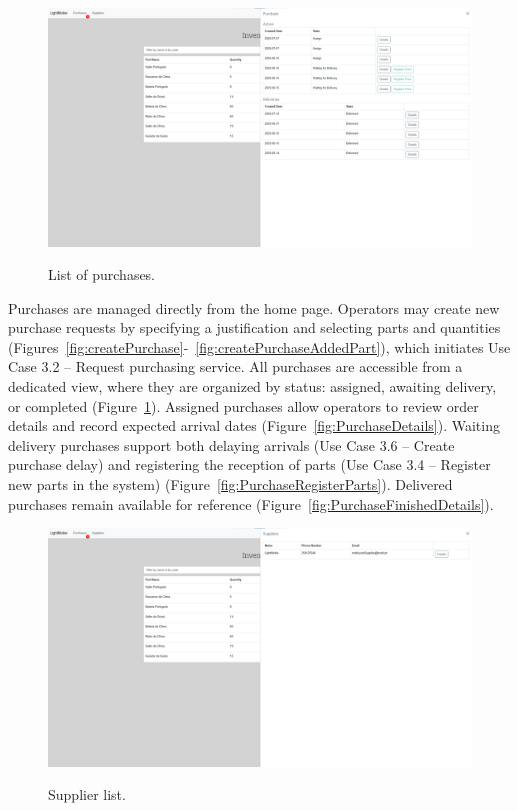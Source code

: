 \begin{figure}[h]
  \caption{List of purchases.}
  \centering
  \includegraphics[width=\textwidth]{figs/Implementation/warehouse/PurchaseList}
  \label{fig:PurchaseList}
\end{figure}






Purchases are managed directly from the home page. Operators may create new purchase requests by specifying a justification and selecting parts and quantities (Figures~\ref{fig:createPurchase}-~\ref{fig:createPurchaseAddedPart}), which initiates Use Case 3.2 – Request purchasing service. All purchases are accessible from a dedicated view, where they are organized by status: assigned, awaiting delivery, or completed (Figure~\ref{fig:PurchaseList}). Assigned purchases allow operators to review order details and record expected arrival dates (Figure~\ref{fig:PurchaseDetails}). Waiting delivery purchases support both delaying arrivals (Use Case 3.6 – Create purchase delay) and registering the reception of parts (Use Case 3.4 – Register new parts in the system) (Figure~\ref{fig:PurchaseRegisterParts}). Delivered purchases remain available for reference (Figure~\ref{fig:PurchaseFinishedDetails}).


\begin{figure}[h]
  \caption{Supplier list.}
  \centering
  \includegraphics[width=\textwidth]{figs/Implementation/warehouse/supplierList}
  \label{fig:supplierList}
\end{figure}




